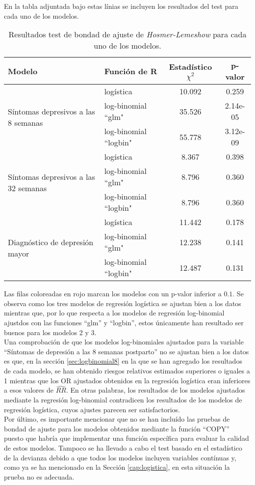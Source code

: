 En la tabla adjuntada bajo estas línias se incluyen los resultados del test para cada uno de los modelos.
\begin{table}[H]
	\centering
	\begin{tabular}{ l | l c c } 
		\toprule
		\textbf{Modelo} & Función de R & Estadístico $\chi^2$ & p-valor\\
		\midrule
		\multirow{3}{10em}{Síntomas depresivos a las 8 semanas} & logística  &  10.092 & 0.259 \\ 
		& \cellcolor[HTML]{ffe4e1}log-binomial ``glm"  & \cellcolor[HTML]{ffe4e1}35.526 & \cellcolor[HTML]{ffe4e1}2.14e-05\\ 
		&\cellcolor[HTML]{ffe4e1}log-binomial ``logbin"  & \cellcolor[HTML]{ffe4e1}55.778  & \cellcolor[HTML]{ffe4e1}3.12e-09  \\ 
		\midrule
		\multirow{3}{10em}{Síntomas depresivos a las 32 semanas} & logística  & 8.367  & 0.398 \\ 
		& log-binomial ``glm"   &  8.796    &0.360\\ 
		& log-binomial ``logbin"   &  8.796  & 0.360 \\ 
		\midrule
		\multirow{3}{10em}{Diagnóstico de depresión mayor} & logística  &  11.442 & 0.178\\ 
		& log-binomial ``glm"   &  12.238  &   0.141\\ 
		& log-binomial ``logbin"   &  12.487 & 0.131\\
		\bottomrule
	\end{tabular}
	\caption{Resultados test de bondad de ajuste de \textit{Hosmer-Lemeshow} para cada uno de los modelos.}
	\label{tab:18}
\end{table}
Las filas coloreadas en rojo marcan los modelos con un p-valor inferior a $0.1$. Se observa como los tres modelos de regresión logística se ajustan bien a los datos mientras que, por lo que respecta a los modelos de regresión log-binomial ajustdos con las funciones ``glm'' y ``logbin'', estos únicamente han resultado ser buenos para los modelos 2 y 3. \\

Una comprobación de que los modelos log-binomiales ajustados para la variable ``Síntomas de depresión a las 8 semanas postparto'' no se ajustan bien a los datos es que, en la sección \ref{sec:logbinomial8} en la que se han agregado los resultados de cada modelo, se han obtenido riesgos relativos estimados superiores o iguales a 1 mientras que los OR ajustados obtenidos en la regresión logística eran inferiores a esos valores de $\widehat{RR}$. En otras palabras, los resultados de los modelos ajustados mediante la regresión log-binomial contradicen los resultados de los modelos de regresión logística, cuyos ajustes parecen ser satisfactorios.\\

Por último, es importante mencionar que no se han incluído las pruebas de bondad de ajuste para los modelos obtenidos mediante la función ``COPY'' puesto que habría que implementar una función específica para evaluar la calidad de estos modelos. Tampoco se ha llevado a cabo el test basado en el estadístico de la devianza debido a que todos los modelos incluyen variables contínuas y, como ya se ha mencionado en la Sección \ref{cap:logistica}, en esta situación la prueba no es adecuada. 